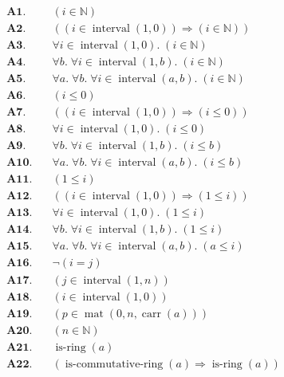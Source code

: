 \documentclass[11pt]{article}
\theoremstyle{plain}
\begin{document}
\begin{align*}
  \mathbf{A1.}\quad & (i \in \mathbb{N}) \\
  \mathbf{A2.}\quad & ((i \in \operatorname{interval}(1, 0)) \Rightarrow (i \in \mathbb{N})) \\
  \mathbf{A3.}\quad & \forall i \in \operatorname{interval}(1, 0).\; (i \in \mathbb{N}) \\
  \mathbf{A4.}\quad & \forall b.\; \forall i \in \operatorname{interval}(1, b).\; (i \in \mathbb{N}) \\
  \mathbf{A5.}\quad & \forall a.\; \forall b.\; \forall i \in \operatorname{interval}(a, b).\; (i \in \mathbb{N}) \\
  \mathbf{A6.}\quad & (i \leq 0) \\
  \mathbf{A7.}\quad & ((i \in \operatorname{interval}(1, 0)) \Rightarrow (i \leq 0)) \\
  \mathbf{A8.}\quad & \forall i \in \operatorname{interval}(1, 0).\; (i \leq 0) \\
  \mathbf{A9.}\quad & \forall b.\; \forall i \in \operatorname{interval}(1, b).\; (i \leq b) \\
  \mathbf{A10.}\quad & \forall a.\; \forall b.\; \forall i \in \operatorname{interval}(a, b).\; (i \leq b) \\
  \mathbf{A11.}\quad & (1 \leq i) \\
  \mathbf{A12.}\quad & ((i \in \operatorname{interval}(1, 0)) \Rightarrow (1 \leq i)) \\
  \mathbf{A13.}\quad & \forall i \in \operatorname{interval}(1, 0).\; (1 \leq i) \\
  \mathbf{A14.}\quad & \forall b.\; \forall i \in \operatorname{interval}(1, b).\; (1 \leq i) \\
  \mathbf{A15.}\quad & \forall a.\; \forall b.\; \forall i \in \operatorname{interval}(a, b).\; (a \leq i) \\
  \mathbf{A16.}\quad & \neg (i = j) \\
  \mathbf{A17.}\quad & (j \in \operatorname{interval}(1, n)) \\
  \mathbf{A18.}\quad & (i \in \operatorname{interval}(1, 0)) \\
  \mathbf{A19.}\quad & (p \in \operatorname{mat}(0, n, \operatorname{carr}(a))) \\
  \mathbf{A20.}\quad & (n \in \mathbb{N}) \\
  \mathbf{A21.}\quad & \operatorname{is\text{-}ring}(a) \\
  \mathbf{A22.}\quad & (\operatorname{is\text{-}commutative\text{-}ring}(a) \Rightarrow \operatorname{is\text{-}ring}(a)) \\

\end{align*}
\end{document}
